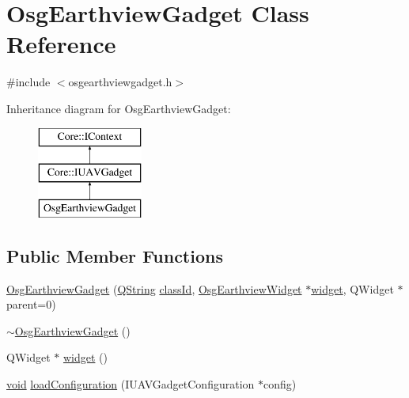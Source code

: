 \hypertarget{class_osg_earthview_gadget}{\section{\-Osg\-Earthview\-Gadget \-Class \-Reference}
\label{class_osg_earthview_gadget}
}


{\ttfamily \#include $<$osgearthviewgadget.\-h$>$}

\-Inheritance diagram for \-Osg\-Earthview\-Gadget\-:\begin{figure}[H]
\begin{center}
\leavevmode
\includegraphics[height=3.000000cm]{class_osg_earthview_gadget}
\end{center}
\end{figure}
\subsection*{\-Public \-Member \-Functions}
\begin{DoxyCompactItemize}
\item 
\hyperlink{class_osg_earthview_gadget_a640ab0335938bff4c3f40acc73cbea84}{\-Osg\-Earthview\-Gadget} (\hyperlink{group___u_a_v_objects_plugin_gab9d252f49c333c94a72f97ce3105a32d}{\-Q\-String} \hyperlink{group___core_plugin_ga3878fde66a57220608960bcc3fbeef2c}{class\-Id}, \hyperlink{class_osg_earthview_widget}{\-Osg\-Earthview\-Widget} $\ast$\hyperlink{class_osg_earthview_gadget_afe0558c328aaab48a03a82e29a57f879}{widget}, \-Q\-Widget $\ast$parent=0)
\item 
\hyperlink{class_osg_earthview_gadget_a6c3a0877d6a6f071d319411494f395ea}{$\sim$\-Osg\-Earthview\-Gadget} ()
\item 
\-Q\-Widget $\ast$ \hyperlink{class_osg_earthview_gadget_afe0558c328aaab48a03a82e29a57f879}{widget} ()
\item 
\hyperlink{group___u_a_v_objects_plugin_ga444cf2ff3f0ecbe028adce838d373f5c}{void} \hyperlink{class_osg_earthview_gadget_ac53e65d3181a74cec9e5784b27b6c117}{load\-Configuration} (\-I\-U\-A\-V\-Gadget\-Configuration $\ast$config)
\end{DoxyCompactItemize}


